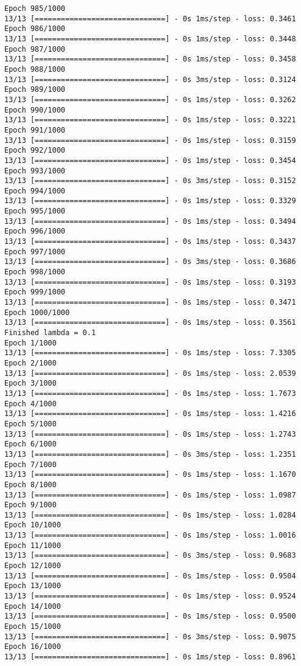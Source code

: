 \documentclass[11pt]{article}
\begin{document}
\begin{Verbatim}[commandchars=\\\{\}]
Epoch 985/1000
13/13 [==============================] - 0s 1ms/step - loss: 0.3461
Epoch 986/1000
13/13 [==============================] - 0s 1ms/step - loss: 0.3448
Epoch 987/1000
13/13 [==============================] - 0s 1ms/step - loss: 0.3458
Epoch 988/1000
13/13 [==============================] - 0s 3ms/step - loss: 0.3124
Epoch 989/1000
13/13 [==============================] - 0s 1ms/step - loss: 0.3262
Epoch 990/1000
13/13 [==============================] - 0s 1ms/step - loss: 0.3221
Epoch 991/1000
13/13 [==============================] - 0s 1ms/step - loss: 0.3159
Epoch 992/1000
13/13 [==============================] - 0s 1ms/step - loss: 0.3454
Epoch 993/1000
13/13 [==============================] - 0s 3ms/step - loss: 0.3152
Epoch 994/1000
13/13 [==============================] - 0s 1ms/step - loss: 0.3329
Epoch 995/1000
13/13 [==============================] - 0s 1ms/step - loss: 0.3494
Epoch 996/1000
13/13 [==============================] - 0s 1ms/step - loss: 0.3437
Epoch 997/1000
13/13 [==============================] - 0s 3ms/step - loss: 0.3686
Epoch 998/1000
13/13 [==============================] - 0s 1ms/step - loss: 0.3193
Epoch 999/1000
13/13 [==============================] - 0s 1ms/step - loss: 0.3471
Epoch 1000/1000
13/13 [==============================] - 0s 1ms/step - loss: 0.3561
Finished lambda = 0.1
Epoch 1/1000
13/13 [==============================] - 0s 1ms/step - loss: 7.3305
Epoch 2/1000
13/13 [==============================] - 0s 1ms/step - loss: 2.0539
Epoch 3/1000
13/13 [==============================] - 0s 1ms/step - loss: 1.7673
Epoch 4/1000
13/13 [==============================] - 0s 1ms/step - loss: 1.4216
Epoch 5/1000
13/13 [==============================] - 0s 1ms/step - loss: 1.2743
Epoch 6/1000
13/13 [==============================] - 0s 3ms/step - loss: 1.2351
Epoch 7/1000
13/13 [==============================] - 0s 1ms/step - loss: 1.1670
Epoch 8/1000
13/13 [==============================] - 0s 1ms/step - loss: 1.0987
Epoch 9/1000
13/13 [==============================] - 0s 1ms/step - loss: 1.0284
Epoch 10/1000
13/13 [==============================] - 0s 1ms/step - loss: 1.0016
Epoch 11/1000
13/13 [==============================] - 0s 3ms/step - loss: 0.9683
Epoch 12/1000
13/13 [==============================] - 0s 1ms/step - loss: 0.9504
Epoch 13/1000
13/13 [==============================] - 0s 1ms/step - loss: 0.9524
Epoch 14/1000
13/13 [==============================] - 0s 1ms/step - loss: 0.9500
Epoch 15/1000
13/13 [==============================] - 0s 3ms/step - loss: 0.9075
Epoch 16/1000
13/13 [==============================] - 0s 1ms/step - loss: 0.8961

\end{Verbatim}
\end{document}
